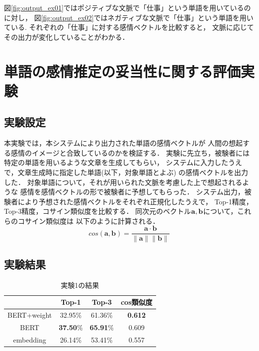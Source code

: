 		図\ref{fig:output_ex01}ではポジティブな文脈で「仕事」という単語を用いているのに対し，
		図\ref{fig:output_ex02}ではネガティブな文脈で「仕事」という単語を用いている.
		それぞれの「仕事」に対する感情ベクトルを比較すると，
		文脈に応じてその出力が変化していることがわかる．

\section{単語の感情推定の妥当性に関する評価実験}
	\subsection{実験設定}
		本実験では，本システムにより出力された単語の感情ベクトルが
		人間の想起する感情のイメージと合致しているのかを検証する．
		実験に先立ち，被験者には特定の単語を用いるような文章を生成してもらい，
		システムに入力したうえで，文章生成時に指定した単語(以下，対象単語とよぶ)
		の感情ベクトルを出力した．
		対象単語について，それが用いられた文脈を考慮した上で想起されるような
		感情を感情ベクトルの形で被験者に予想してもらった．
		システム出力，被験者により予想された感情ベクトルをそれぞれ正規化したうえで，
		Top-1精度，Top-3精度，コサイン類似度を比較する．
		同次元のベクトル$\bold{a},\bold{b}$について，これらのコサイン類似度は
		以下のように計算される．
		\begin{equation}
			cos(\boldsymbol{a},\boldsymbol{b})=\frac{\boldsymbol{a}\cdot\boldsymbol{b}}{\|\boldsymbol{a}\|\|\boldsymbol{b}\|}
		\end{equation}

	\subsection{実験結果}
		\begin{table}[H]
			\centering
			\caption{実験1の結果}
			\label{table:top-k_cos-sim_all}
				\begin{tabular}{cccc}
					\hline
					& Top-1 & Top-3 & cos類似度 \\
					\hline \hline
					BERT+weight & 32.95\% & 61.36\% & \textbf{0.612} \\
					BERT & \textbf{37.50}\% & \textbf{65.91}\% & 0.609 \\
					embedding & 26.14\% & 53.41\% & 0.557\\
					\hline
				\end{tabular}
		\end{table}
